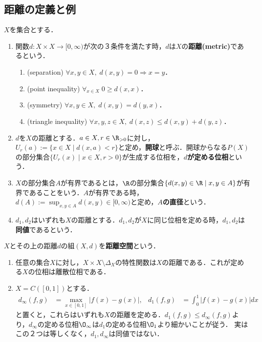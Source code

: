 \documentclass[uplatex,dvipdfmx]{jsreport}
\begin{document}
\subsection{距離の定義と例}

\begin{definition}
    $X$を集合とする．
    \begin{enumerate}
        \item 関数$d:X\times X\to[0,\infty)$が次の３条件を満たす時，$d$は$X$の\textbf{距離(metric)}であるという．
        \begin{enumerate}[(1)]
            \item (separation) $\forall x,y\in X,\; d(x,y)=0\Rightarrow x=y$．
            \item (point inequality) $\forall_{x\in X}\;0\ge d(x,x)$．
            \item (symmetry) $\forall x,y\in X,\; d(x,y)=d(y,x)$．
            \item (triangle inequality) $\forall x,y,z\in X,\; d(x,z)\le d(x,y)+d(y,z)$．
        \end{enumerate}
        \item $d$を$X$の距離とする．$a\in X,r\in\R_{>0}$に対し，$U_r(a):=\{x\in X\mid d(x,a)<r\}$と定め，\textbf{開球}と呼ぶ．開球からなる$P(X)$の部分集合$\{U_r(x)\mid x\in X,r>0\}$が生成する位相を，\textbf{$d$が定める位相}という．
        \item $X$の部分集合$A$が有界であるとは，$\R$の部分集合$\{d(x,y)\in\R\mid x,y\in A\}$が有界であることをいう．$A$が有界である時，$d(A):=\sup_{x,y\in A}d(x,y)\in [0,\infty)$と定め，\textbf{$A$の直径}という．
        \item $d_1,d_2$はいずれも$X$の距離とする．$d_1,d_2$が$X$に同じ位相を定める時，$d_1,d_2$は\textbf{同値}であるという．
    \end{enumerate}
    $X$とその上の距離$d$の組$(X,d)$を\textbf{距離空間}という．
\end{definition}

\begin{example}\mbox{}
    \begin{enumerate}
        \item 任意の集合$X$に対し，$X\times X\setminus\Delta_X$の特性関数は$X$の距離である．これが定める$X$の位相は離散位相である．
        \item $X=C([0,1])$とする．\begin{align*}
            d_\infty(f,g)&=\max_{x\in[0,1]}|f(x)-g(x)|,&d_1(f,g)&=\int^1_0|f(x)-g(x)|dx
        \end{align*}と置くと，これらはいずれも$X$の距離を定める．$d_1(f,g)\le d_\infty(f,g)$より，$d_\infty$の定める位相$\O_\infty$は$d_1$の定める位相$\O_1$より細かいことが従う．
        実はこの２つは等しくなく，$d_1,d_\infty$は同値ではない．
    \end{enumerate}
\end{example}
\end{document}
